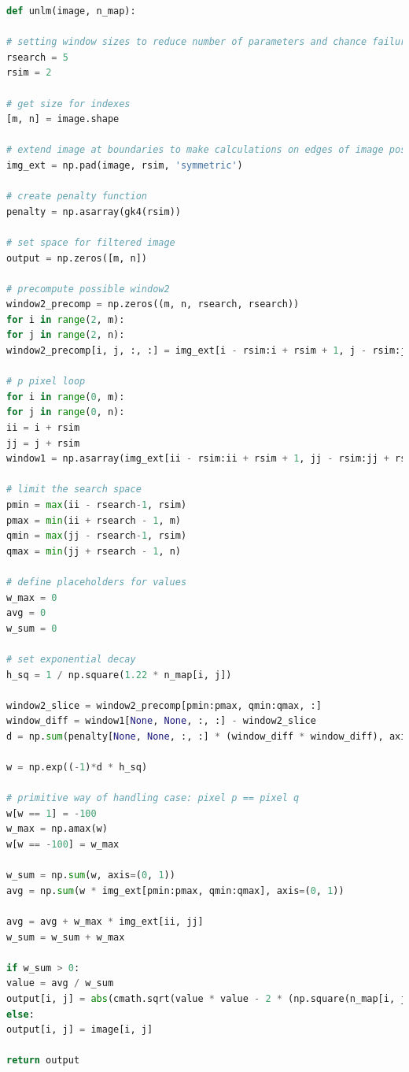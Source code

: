 \begin{lstlisting}[language=Python, caption = UNLM algorithm code.]
def unlm(image, n_map):

# setting window sizes to reduce number of parameters and chance failure caused by user
rsearch = 5
rsim = 2

# get size for indexes
[m, n] = image.shape

# extend image at boundaries to make calculations on edges of image possible
img_ext = np.pad(image, rsim, 'symmetric')

# create penalty function
penalty = np.asarray(gk4(rsim))

# set space for filtered image
output = np.zeros([m, n])

# precompute possible window2
window2_precomp = np.zeros((m, n, rsearch, rsearch))
for i in range(2, m):
for j in range(2, n):
window2_precomp[i, j, :, :] = img_ext[i - rsim:i + rsim + 1, j - rsim:j + rsim + 1]

# p pixel loop
for i in range(0, m):
for j in range(0, n):
ii = i + rsim
jj = j + rsim
window1 = np.asarray(img_ext[ii - rsim:ii + rsim + 1, jj - rsim:jj + rsim + 1])

# limit the search space
pmin = max(ii - rsearch-1, rsim)
pmax = min(ii + rsearch - 1, m)
qmin = max(jj - rsearch-1, rsim)
qmax = min(jj + rsearch - 1, n)

# define placeholders for values
w_max = 0
avg = 0
w_sum = 0

# set exponential decay
h_sq = 1 / np.square(1.22 * n_map[i, j])

window2_slice = window2_precomp[pmin:pmax, qmin:qmax, :]
window_diff = window1[None, None, :, :] - window2_slice
d = np.sum(penalty[None, None, :, :] * (window_diff * window_diff), axis=(2, 3))

w = np.exp((-1)*d * h_sq)

# primitive way of handling case: pixel p == pixel q
w[w == 1] = -100
w_max = np.amax(w)
w[w == -100] = w_max

w_sum = np.sum(w, axis=(0, 1))
avg = np.sum(w * img_ext[pmin:pmax, qmin:qmax], axis=(0, 1))

avg = avg + w_max * img_ext[ii, jj]
w_sum = w_sum + w_max

if w_sum > 0:
value = avg / w_sum
output[i, j] = abs(cmath.sqrt(value * value - 2 * (np.square(n_map[i, j]))))
else:
output[i, j] = image[i, j]

return output
\end{lstlisting}


